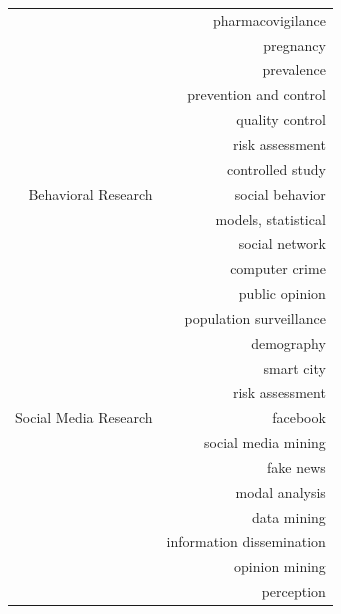 \begin{center}
\begin{longtable}{ rr }
                              & pharmacovigilance               \\
                              & pregnancy                       \\
                              & prevalence                      \\
                              & prevention and control          \\
                              & quality control                 \\
                              & risk assessment                 \\
                              & controlled study                \\
        \hline
        Behavioral Research   & social behavior                 \\
                              & models, statistical             \\
                              & social network                  \\
                              & computer crime                  \\
                              & public opinion                  \\
                              & population surveillance         \\
                              & demography                      \\
                              & smart city                      \\
                              & risk assessment                 \\
        \hline
        Social Media Research & facebook                        \\
                              & social media mining             \\
                              & fake news                       \\
                              & modal analysis                  \\
                              & data mining                     \\
                              & information dissemination       \\
                              & opinion mining                  \\
                              & perception                      \\
        \hline

\end{longtable}
\end{center}

